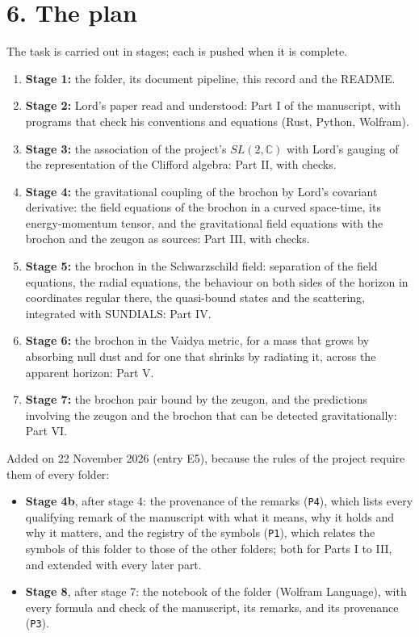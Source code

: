 \documentclass[
  10pt,
]{article}
\providecommand{\tightlist}{%
  \setlength{\itemsep}{0pt}\setlength{\parskip}{0pt}}
\begin{document}
\hypertarget{the-plan}{%
\section{6. The plan}\label{the-plan}}

The task is carried out in stages; each is pushed when it is complete.

\begin{enumerate}
\def\labelenumi{\arabic{enumi}.}
\tightlist
\item
  \textbf{Stage 1:} the folder, its document pipeline, this record and
  the README.
\item
  \textbf{Stage 2:} Lord's paper read and understood: Part I of the
  manuscript, with programs that check his conventions and equations
  (Rust, Python, Wolfram).
\item
  \textbf{Stage 3:} the association of the project's \(SL(2,\mathbb C)\)
  with Lord's gauging of the representation of the Clifford algebra:
  Part II, with checks.
\item
  \textbf{Stage 4:} the gravitational coupling of the brochon by Lord's
  covariant derivative: the field equations of the brochon in a curved
  space-time, its energy-momentum tensor, and the gravitational field
  equations with the brochon and the zeugon as sources: Part III, with
  checks.
\item
  \textbf{Stage 5:} the brochon in the Schwarzschild field: separation
  of the field equations, the radial equations, the behaviour on both
  sides of the horizon in coordinates regular there, the quasi-bound
  states and the scattering, integrated with SUNDIALS: Part IV.
\item
  \textbf{Stage 6:} the brochon in the Vaidya metric, for a mass that
  grows by absorbing null dust and for one that shrinks by radiating it,
  across the apparent horizon: Part V.
\item
  \textbf{Stage 7:} the brochon pair bound by the zeugon, and the
  predictions involving the zeugon and the brochon that can be detected
  gravitationally: Part VI.
\end{enumerate}

Added on 22 November 2026 (entry E5), because the rules of the project
require them of every folder:

\begin{itemize}
\tightlist
\item
  \textbf{Stage 4b}, after stage 4: the provenance of the remarks
  (\texttt{P4}), which lists every qualifying remark of the manuscript
  with what it means, why it holds and why it matters, and the registry
  of the symbols (\texttt{P1}), which relates the symbols of this folder
  to those of the other folders; both for Parts I to III, and extended
  with every later part.
\item
  \textbf{Stage 8}, after stage 7: the notebook of the folder (Wolfram
  Language), with every formula and check of the manuscript, its
  remarks, and its provenance (\texttt{P3}).
\end{itemize}
\end{document}
